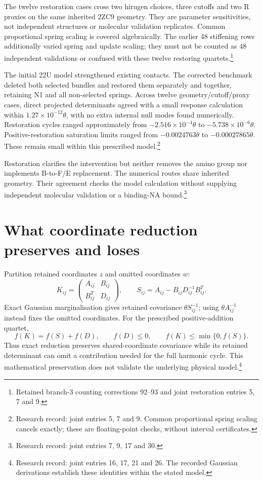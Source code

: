 \documentclass{article}
\begin{document}
The twelve restoration cases cross two hirugen choices, three cutoffs and two R proxies on the same inherited 2ZC9 geometry. They are parameter sensitivities, not independent structures or molecular validation replicates. Common proportional spring scaling is covered algebraically. The earlier 48 stiffening rows additionally varied spring and update scaling; they must not be counted as 48 independent validations or confused with these twelve restoring quartets.\footnote{Retained branch-3 counting corrections 92--93 and joint restoration entries 5, 7 and 9.}

The initial 22U model strengthened existing contacts. The corrected benchmark deleted both selected bundles and restored them separately and together, retaining N1 and all non-selected springs. Across twelve geometry/cutoff/proxy cases, direct projected determinants agreed with a small response calculation within \(1.27\times10^{-12}\theta\), with no extra internal null modes found numerically. Restoration cycles ranged approximately from \(-2.516\times10^{-4}\theta\) to \(-5.738\times10^{-6}\theta\). Positive-restoration saturation limits ranged from \(-0.0024763\theta\) to \(-0.00027865\theta\). These remain small within this prescribed model.\footnote{Research record: joint entries 5, 7 and 9. Common proportional spring scaling cancels exactly; these are floating-point checks, without interval certificates.}

Restoration clarifies the intervention but neither removes the amino group nor implements B-to-F/E replacement. The numerical routes share inherited geometry. Their agreement checks the model calculation without supplying independent molecular validation or a binding-NA bound.\footnote{Research record: joint entries 7, 9, 17 and 30.}

\section{What coordinate reduction preserves and loses}
Partition retained coordinates \(z\) and omitted coordinates \(w\):
\[
 K_{ij}=\begin{pmatrix}A_{ij}&B_{ij}\\B_{ij}^T&D_{ij}\end{pmatrix},
 \qquad S_{ij}=A_{ij}-B_{ij}D_{ij}^{-1}B_{ij}^T.
\]
Exact Gaussian marginalisation gives retained covariance \(\theta S_{ij}^{-1}\); using \(\theta A_{ij}^{-1}\) instead fixes the omitted coordinates. For the prescribed positive-addition quartet,
\[
 f(K)=f(S)+f(D),\qquad f(D)\le0,
 \qquad f(K)\le\min\{0,f(S)\}.
\]
Thus exact reduction preserves shared-coordinate covariance while its retained determinant can omit a contribution needed for the full harmonic cycle. This mathematical preservation does not validate the underlying physical model.\footnote{Research record: joint entries 16, 17, 21 and 26. The recorded Gaussian derivations establish these identities within the stated model.}
\end{document}
